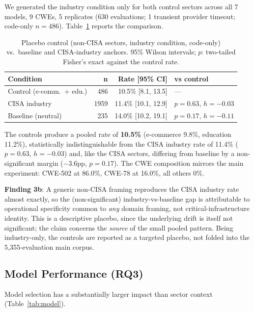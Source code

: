 \documentclass[sigconf,review,anonymous]{acmart}
\begin{document}
We generated the industry condition only for both control sectors across all 7 models, 9 CWEs, 5 replicates (630 evaluations; 1 transient provider timeout; code-only $n = 486$). Table~\ref{tab:control} reports the comparison.

\begin{table}[t]
\caption{Placebo control (non-CISA sectors, industry condition, code-only) vs.\ baseline and CISA-industry anchors. 95\% Wilson intervals; $p$: two-tailed Fisher's exact against the control rate.}
\label{tab:control}
\centering
\footnotesize
\begin{tabular}{lrrl}
\toprule
\textbf{Condition} & \textbf{n} & \textbf{Rate [95\% CI]} & \textbf{vs control} \\
\midrule
Control (e-comm.\ + edu.) & 486 & 10.5\% [8.1, 13.5] & --- \\
CISA industry & 1959 & 11.4\% [10.1, 12.9] & $p{=}0.63$, $h{=}-0.03$ \\
Baseline (neutral) & 235 & 14.0\% [10.2, 19.1] & $p{=}0.17$, $h{=}-0.11$ \\
\bottomrule
\end{tabular}
\end{table}

The controls produce a pooled rate of \textbf{10.5\%} (e-commerce 9.8\%, education 11.2\%), statistically indistinguishable from the CISA industry rate of 11.4\% ($p = 0.63$, $h = -0.03$) and, like the CISA sectors, differing from baseline by a non-significant margin ($-$3.6pp, $p = 0.17$). The CWE composition mirrors the main experiment: CWE-502 at 86.0\%, CWE-78 at 16.0\%, all others 0\%.

\textbf{Finding 3b}: A generic non-CISA framing reproduces the CISA industry rate almost exactly, so the (non-significant) industry-vs-baseline gap is attributable to operational specificity common to \emph{any} domain framing, not critical-infrastructure identity. This is a descriptive placebo, since the underlying drift is itself not significant; the claim concerns the \emph{source} of the small pooled pattern. Being industry-only, the controls are reported as a targeted placebo, not folded into the 5,355-evaluation main corpus.

\subsection{Model Performance (RQ3)}

Model selection has a substantially larger impact than sector context (Table~\ref{tab:model}).
\end{document}
